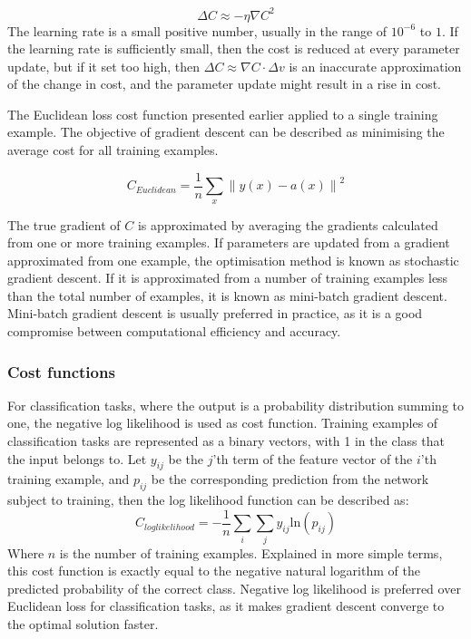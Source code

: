 $$\Delta C \approx - \eta {\nabla C}^2 $$
The learning rate is a small positive number, usually in the range of $10^{-6}$ to $1$. If the learning rate is sufficiently small, then the cost is reduced at every parameter update, but if it set too high, then $\Delta C \approx \nabla C \cdot \Delta v $ is an inaccurate approximation of the change in cost, and the parameter update might result in a rise in cost. \newline

The Euclidean loss cost function presented earlier applied to a single training example. The objective of gradient descent can be described as minimising the average cost for all training examples.

$$C_{Euclidean} = \frac{1}{n} \sum_{x} {\lVert y(x) - a(x) \rVert}^2$$

The true gradient of $C$ is approximated by averaging the gradients calculated from one or more training examples. If parameters are updated from a gradient approximated from one example, the optimisation method is known as stochastic gradient descent. If it is approximated from a number of training examples less than the total number of examples, it is known as mini-batch gradient descent. Mini-batch gradient descent is usually preferred in practice, as it is a good compromise between computational efficiency and accuracy.

\subsubsection{Cost functions}
\label{sec:negative}
For classification tasks, where the output is a probability distribution summing to one, the negative log likelihood is used as cost function. Training examples of classification tasks are represented as a binary vectors, with 1 in the class that the input belongs to. Let $y_{ij}$ be the $j$'th term of the feature vector of the $i$'th training example, and $p_{ij}$ be the corresponding prediction from the network subject to training, then the log likelihood function can be described as:
$$ C_{loglikelihood} = -\frac{1}{n} \sum_{i} \sum_{j} y_{ij}\text{ln}(p_{ij}) $$
Where $n$ is the number of training examples. Explained in more simple terms, this cost function is exactly equal to the negative natural logarithm of the predicted probability of the correct class. Negative log likelihood is preferred over Euclidean loss for classification tasks, as it makes gradient descent converge to the optimal solution faster\cite{Solla}.


